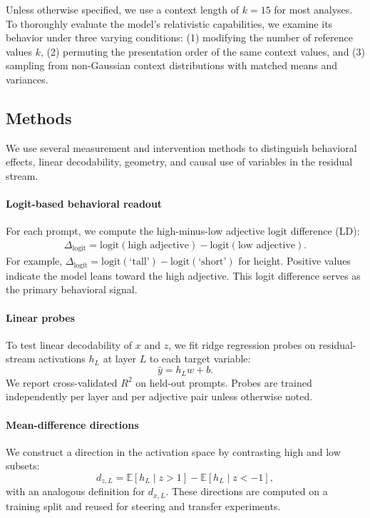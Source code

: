 \documentclass{article}
\newcommand{\logitdiff}{\ensuremath{\Delta_{\mathrm{logit}}}}
\begin{document}
Unless otherwise specified, we use a context length of $k=15$ for most analyses. To thoroughly evaluate the model's relativistic capabilities, we examine its behavior under three varying conditions: (1) modifying the number of reference values $k$, (2) permuting the presentation order of the same context values, and (3) sampling from non-Gaussian context distributions with matched means and variances.


\subsection{Methods}
\label{subsec:methods}
We use several measurement and intervention methods to distinguish behavioral effects, linear decodability, geometry, and causal use of variables in the residual stream.

\paragraph{Logit-based behavioral readout}
For each prompt, we compute the high-minus-low adjective logit difference (LD):
\begin{align*}
    \logitdiff = \mathrm{logit}(\text{high adjective}) -
\mathrm{logit}(\text{low adjective}).
\end{align*}
For example, $\logitdiff=\mathrm{logit}(\text{`tall'})-\mathrm{logit}(\text{`short'})$ for height.
Positive values indicate the model leans toward the high adjective.
This logit difference serves as the primary behavioral signal.

\paragraph{Linear probes}
To test linear decodability of $x$ and $z$, we fit ridge regression probes on residual-stream activations $h_L$ at layer $L$ to each target variable:
\[
\hat y = h_L w + b.
\]
We report cross-validated $R^2$ on held-out prompts.
Probes are trained independently per layer and per adjective pair unless otherwise noted.

\paragraph{Mean-difference directions}
We construct a direction in the activation space by contrasting high and low subsets:
\[
d_{z,L}
= \mathbb{E}[h_L \mid z>1] - \mathbb{E}[h_L \mid z<-1],
\]
with an analogous definition for $d_{x,L}$.
These directions are computed on a training split and reused for steering and transfer experiments.
\end{document}
